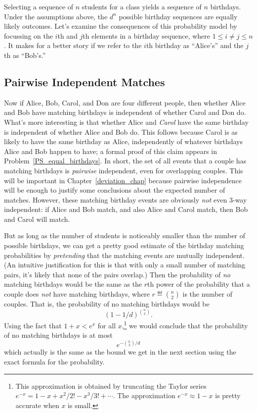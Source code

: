 Selecting a sequence of $n$ students for a class yields a sequence of
$n$ birthdays.  Under the assumptions above, the $d^n$ possible
birthday sequences are equally likely outcomes.  Let's examine the
consequences of this probability model by focussing on the $i$th and
$j$th elements in a birthday sequence, where $1 \leq i \neq j \leq n$.
It makes for a better story if we refer to the $i$th birthday as
``Alice's'' and the $j$th as ``Bob's.''

\subsection{Pairwise Independent Matches}
Now if Alice, Bob, Carol, and Don are four different people, then
whether Alice and Bob have matching birthdays is independent of
whether Carol and Don do.  What's more interesting is that whether
Alice and \emph{Carol} have the same birthday is independent of
whether Alice and Bob do.  This follows because Carol is as likely to
have the same birthday as Alice, independently of whatever birthdays
Alice and Bob happen to have; a formal proof of this claim appears in
Problem~\ref{PS_equal_birthdays}.  In short, the set of all events
that a couple has matching birthdays is 
\emph{pairwise} independent, even for overlapping couples.  This will
be important in Chapter~\ref{deviation_chap} because pairwise
independence will be enough to justify some conclusions about the
expected number of matches.  However, these matching birthday events
are obviously \emph{not} even 3-way independent: if Alice and Bob
match, and also Alice and Carol match, then Bob and Carol will match.

\iffalse
We could justify all these assertions of independence using the four
step method, but it's pretty boring, and we'll skip it.
\fi

But as long as the number of students is noticeably smaller than the
number of possible birthdays, we can get a pretty good estimate of the
birthday matching probabilities by \emph{pretending} that the matching
events are mutually independent.  (An intuitive justification for this
is that with only a small number of matching pairs, it's likely that
none of the pairs overlap.)  Then the probability of \emph{no}
matching birthdays would be the same as the $r$th power of the
probability that a couple does \emph{not} have matching birthdays,
where $r \eqdef \binom{n}{2}$ is the number of couples.  That is, the
probability of no matching birthdays would be
\begin{equation}\label{11dbinn2}
(1-1/d)^{\binom{n}{2}}.
\end{equation}
Using the fact that $1+x < e^x$ for all $x$,\footnote{This
  approximation is obtained by truncating the Taylor series $e^{-x} =
  1 - x + x^2/2!  - x^3/3! + \cdots$.  The approximation $e^{-x}
  \approx 1 - x$ is pretty accurate when $x$ is small.} we would conclude
that the probability of no matching birthdays is at most
\begin{equation}\label{bday-approx}
e^{-\binom{n}{2}/d}
\end{equation}
which actually is the same as the bound we get in the next section
using the exact formula for the probability.

